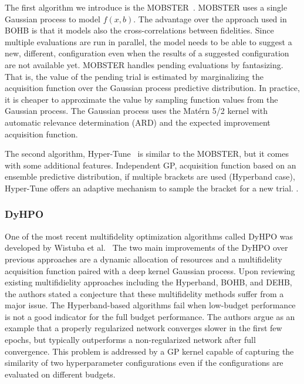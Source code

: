 The first algorithm we introduce is the MOBSTER~\cite{klein2020model}. MOBSTER uses a single Gaussian process to model $f(x,b)$. The advantage over the approach used in BOHB is that it models also the cross-correlations between fidelities. Since multiple evaluations are run in parallel, the model needs to be able to suggest a new, different, configuration even when the results of a suggested configuration are not available yet. MOBSTER handles pending evaluations by fantasizing. That is, the value of the pending trial is estimated by marginalizing the acquisition function over the Gaussian process predictive distribution. In practice, it is cheaper to approximate the value by sampling function values from the Gaussian process. The Gaussian process uses the Matérn 5/2 kernel with automatic relevance determination (ARD) and the expected improvement acquisition function.

The second algorithm, Hyper-Tune~\cite{li2022hyper} is similar to the MOBSTER, but it comes with some additional features. Independent GP, acquisition function based on an ensemble predictive distribution, if multiple brackets are used (Hyperband case), Hyper-Tune offers an adaptive mechanism to sample the bracket for a new trial. .


\subsubsection{DyHPO}
One of the most recent multifidelity optimization algorithms called DyHPO was developed by Wistuba et al.~\cite{wistuba2022supervising} The two main improvements of the DyHPO over previous approaches are a dynamic allocation of resources and a multifidelity acquisition function paired with a deep kernel Gaussian process. Upon reviewing existing multifidielity approaches including the Hyperband, BOHB, and DEHB, the authors stated a conjecture that these multifidelity methods suffer from a major issue. The Hyperband-based algorithms fail when low-budget performance is not a good indicator for the full budget performance. The authors argue as an example that a properly regularized network converges slower in the first few epochs, but typically outperforms a non-regularized network after full convergence. This problem is addressed by a GP kernel capable of capturing the similarity of two hyperparameter configurations even if the configurations are evaluated on different budgets.

